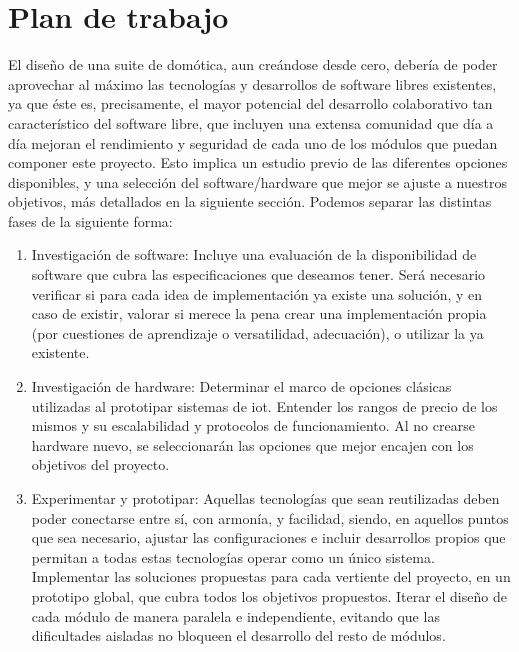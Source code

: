\section{Plan de trabajo}
\label{ch:Capitulo1.2}

El diseño de una suite de domótica, aun creándose desde cero, debería de poder aprovechar al máximo las tecnologías y desarrollos de software libres existentes, ya que éste es, precisamente, el mayor potencial del desarrollo colaborativo tan característico del software libre, que incluyen una extensa comunidad que día a día mejoran el rendimiento y seguridad de cada uno de los módulos que puedan componer este proyecto. Esto implica un estudio previo de las diferentes opciones disponibles, y una selección del software/hardware que mejor se ajuste a nuestros objetivos, más detallados en la siguiente sección. Podemos separar las distintas fases de la siguiente forma:

\begin{enumerate}
  \item Investigación de software: Incluye una evaluación de la disponibilidad de software que cubra las especificaciones que deseamos tener. Será necesario verificar si para cada idea de implementación ya existe una solución, y en caso de existir, valorar si merece la pena crear una implementación propia (por cuestiones de aprendizaje o versatilidad, adecuación), o utilizar la ya existente.

  \item Investigación de hardware: Determinar el marco de opciones clásicas utilizadas al prototipar sistemas de \gls{iot}. Entender los rangos de precio de los mismos y su escalabilidad y protocolos de funcionamiento. Al no crearse hardware nuevo, se seleccionarán las opciones que mejor encajen con los objetivos del proyecto.

  \item Experimentar y prototipar: Aquellas tecnologías que sean reutilizadas deben poder conectarse entre sí, con armonía, y facilidad, siendo, en aquellos puntos que sea necesario, ajustar las configuraciones e incluir desarrollos propios que permitan a todas estas tecnologías operar como un único sistema. Implementar las soluciones propuestas para cada vertiente del proyecto, en un prototipo global, que cubra todos los objetivos propuestos. Iterar el diseño de cada módulo de manera paralela e independiente, evitando que las dificultades aisladas no bloqueen el desarrollo del resto de módulos.

\end{enumerate}

